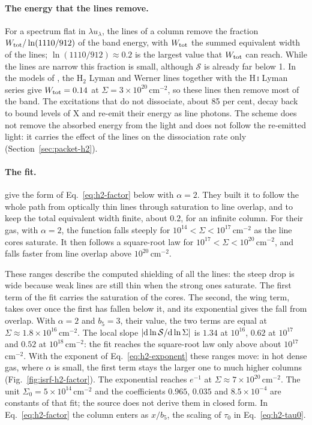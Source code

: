 \paragraph{The energy that the lines remove.} For a spectrum flat in
$\lambda u_\lambda$, the lines of a column remove the fraction
$W_{\rm tot}/\ln(1110/912)$ of the band energy, with $W_{\rm tot}$ the summed
equivalent width of the lines; $\ln(1110/912)\approx0.2$ is the largest value
that $W_{\rm tot}$ can reach. While the lines are narrow this fraction is small,
although $\mathcal S$ is already far below 1. In the models of
\citet{DraineBertoldi1996}, the H$_2$ Lyman and Werner lines together with the
H\,\textsc{i} Lyman series give $W_{\rm tot}=0.14$ at
$\Sigma=3\times10^{20}$\,cm$^{-2}$, so these lines then remove most of the
band. The excitations that do not dissociate, about 85 per cent, decay back to
bound levels of X and re-emit their energy as line photons. The
scheme does not remove the absorbed energy from the light and does not follow
the re-emitted light: it carries the effect of the lines on the dissociation
rate only (Section~\ref{sec:packet-h2}).

\paragraph{The fit.} \citet{DraineBertoldi1996} give the form of
Eq.~\eqref{eq:h2-factor} below with $\alpha=2$. They built it to follow the
whole path from optically thin lines through saturation to line overlap, and
to keep the total equivalent width finite, about $0.2$, for an infinite
column. For their gas, with $\alpha=2$, the function falls steeply for
$10^{14}<\Sigma<10^{17}$\,cm$^{-2}$ as the line cores saturate. It then
follows a square-root law for $10^{17}<\Sigma<10^{20}$\,cm$^{-2}$, and falls
faster from line overlap above $10^{20}$\,cm$^{-2}$.

These ranges describe the computed shielding of all the lines: the steep drop is wide because weak lines
are still thin when the strong ones saturate. The first term of the fit carries
the saturation of the cores. The second, the wing term, takes over once the
first has fallen below it, and its exponential gives the fall from overlap.
With $\alpha=2$ and $b_5=3$, their value, the two terms are equal at
$\Sigma\approx1.8\times10^{16}$\,cm$^{-2}$. The local slope
$|{\rm d}\ln\mathcal S/{\rm d}\ln\Sigma|$ is $1.34$ at $10^{16}$, $0.62$ at
$10^{17}$ and $0.52$ at $10^{18}$\,cm$^{-2}$: the fit reaches the square-root
law only above about $10^{17}$\,cm$^{-2}$. With the exponent of
Eq.~\eqref{eq:h2-exponent} these ranges move: in hot dense gas, where $\alpha$ is small, the
first term stays the larger one to much higher columns
(Fig.~\ref{fig:isrf-h2-factor}). The exponential reaches
$e^{-1}$ at $\Sigma\approx7\times10^{20}$\,cm$^{-2}$. The unit
$\Sigma_0=5\times10^{14}$\,cm$^{-2}$ and the coefficients $0.965$, $0.035$
and $8.5\times10^{-4}$ are constants of that fit; the source does not derive
them in closed form. In Eq.~\eqref{eq:h2-factor} the column enters as
$x/b_5$, the scaling of $\tau_0$ in Eq.~\eqref{eq:h2-tau0}.

